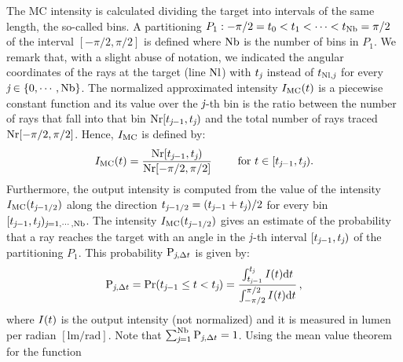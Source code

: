The MC intensity is calculated dividing the target into intervals of the same length, the so-called bins. A partitioning
$P_1: -\pi/2 = t_{0}<t_{1}<\cdots <t_{\textrm{Nb}}=\pi/2$ of the interval $[-\pi/2, \pi/2]$ is defined where $\textrm{Nb}$ is the number of bins in $P_1$.
We remark that, with a slight abuse of notation, we indicated the angular coordinates of the rays at the target (line $\textrm{Nl}$) with $t_{\textit{j}}$ instead of $t_{\textrm{Nl},\textit{j}}$ for every $\textit{j}\in\{0, \cdots, \textrm{Nb}\}$.
The normalized approximated intensity $I_{\textrm{MC}}(t)$ is a piecewise constant function and its value over the $\textit{j}$-th bin is the ratio between the number of rays that fall into that bin
$\textrm{Nr}[t_{\textit{j}-1},t_{\textit{j}})$ and the total number of rays traced $\textrm{Nr}[-\pi/2, \pi/2]$.
Hence, $I_{\textrm{MC}}$ is defined by:
\begin{equation} \label{g_mc}
I_{\textrm{MC}}(t) = \frac{\textrm{Nr}[t_{\textit{j}-1},t_{\textit{j}})}{\textrm{Nr}[-\pi/2, \pi/2]} \qquad \mbox{ for } t\in[t_{\textit{j}-1}, t_{\textit{j}}).
\end{equation}
Furthermore, the output intensity is computed from the value of the intensity $I_{\textrm{MC}}(t_{\textit{j}-1/2})$ along the direction $t_{\textit{j}-1/2}=(t_{\textit{j}-1}+
t_{\textit{j}})/2$ for every bin $[t_{\textit{j}-1},t_{\textit{j}})_{\textit{j} = 1, \cdots, \textrm{Nb}}$.
 The intensity $I_{\textrm{MC}}(t_{\textit{j}-1/2})$ gives an estimate of the probability that a ray reaches the target with an angle in the $\textit{j}$-th interval
$[t_{\textit{j}-1}, t_{\textit{j}})$ of the partitioning $P_1$. This probability $\textrm{P}_{\textit{j}, \Delta t}$ is given by:
\begin{equation}\label{eq:probability}
\textrm{P}_{\textit{j}, \Delta t} = \Pr(t_{\textit{j}-1}\leq t<t_{\textit{j}})=
\frac{\int_{t_{\textit{j}-1}}^{t_{\textit{j}}} I(t) \textrm{d}t}{\int_{-\pi/2}^{\pi/2}I(t) \textrm{d}t}\,,
\end{equation}
where $I(t)$ is the output intensity (not normalized) and it is measured in lumen per radian $[\textrm{lm}/\textrm{rad}]$.
Note that $\sum_{\textit{j}=1}^{\textrm{Nb}}\textrm{P}_{\textit{j}, \Delta t}=1$. Using the mean value theorem for the function
